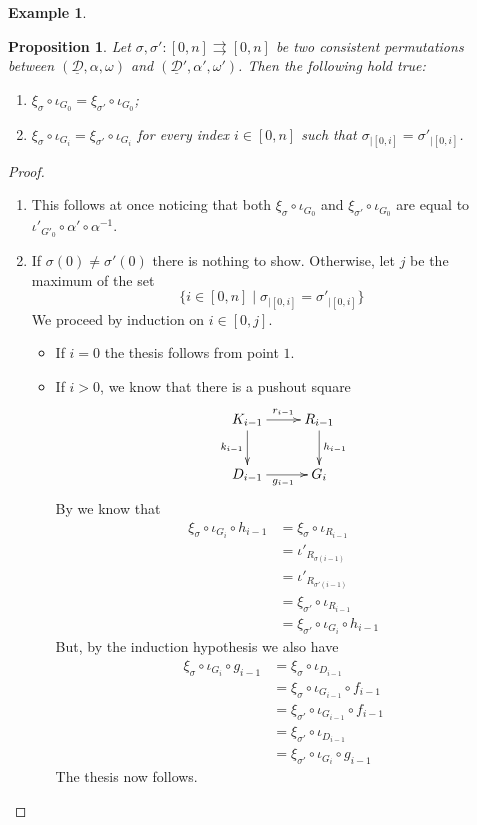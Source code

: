 \documentclass[a4paper]{article}
\newcommand{\dder}[1]{\mathscr{#1}}
\newcommand{\der}[1]{\underline{\dder{#1}}}
\newtheorem{proposition}[theorem]{Proposition}
\theoremstyle{definition}
\newtheorem{example}[theorem]{Example}
\begin{document}
\begin{example}
\end{example}

\begin{proposition}\label{prop:uniqu}
	Let $\sigma,\sigma'\colon [0,n]\rightrightarrows [0,n]$ be two consistent permutations between $(\der{D}, \alpha, \omega)$ and $(\der{D}', \alpha', \omega')$.  Then the following hold true:
	\begin{enumerate}
	\item $\xi_\sigma \circ \iota_{G_0} = \xi_{\sigma'} \circ \iota_{G_0}$;
	\item  $\xi_\sigma \circ \iota_{G_i}=\xi_{\sigma'} \circ \iota_{G_i}$ for every index $i\in [0,n]$ such that $\sigma_{|[0,i]}=\sigma'_{|[0,i]}$.
	\end{enumerate}
\end{proposition}
\begin{proof}\begin{enumerate}
		\item This follows at once noticing that both $\xi_\sigma \circ \iota_{G_0}$ and $\xi_{\sigma'} \circ \iota_{G_0}$ are equal to $\iota'_{G'_0}\circ \alpha'\circ \alpha^{-1}$.
		\item  If $\sigma(0)\neq \sigma'(0)$ there is nothing to show. Otherwise, let $j$ be the maximum of the set
		\[\{i\in [0,n]\mid \sigma_{|[0,i]}=\sigma'_{|[0,i]}\}\]
		We proceed by induction on $i\in [0,j]$. 
		\begin{itemize}
			\item If $i=0$ the thesis follows from point $1$.
			\item If $i>0$, we know that there is a pushout square
			\[\xymatrix{K_{i-1}\ar[r]^{r_{i-1}} \ar[d]_{k_{i-1}}& R_{i-1} \ar[d]^{h_{i-1}}\\ D_{i-1} \ar[r]_{g_{i-1}}& G_i}\] 
			By  we know that
			\begin{align*}
				\xi_\sigma \circ \iota_{G_i}\circ h_{i-1}&=  \xi_\sigma\circ \iota_{R_{i-1}}\\&=\iota'_{R_{\sigma(i-1)}}\\&=\iota'_{R_{\sigma'(i-1)}}\\&=\xi_{\sigma'}\circ \iota_{R_{i-1}}\\&=\xi_{\sigma'} \circ \iota_{G_i}\circ h_{i-1}
			\end{align*}
			But, by the induction hypothesis we also have
			\begin{align*}
				\xi_\sigma \circ \iota_{G_i}\circ g_{i-1}&=\xi_{\sigma}\circ \iota_{D_{i-1}}\\&=\xi_{\sigma}\circ \iota_{G_{i-1}} \circ f_{i-1}\\&=\xi_{\sigma'}\circ \iota_{G_{i-1}} \circ f_{i-1}\\&=\xi_{\sigma'}\circ \iota_{D_{i-1}} \\&=\xi_{\sigma'}\circ \iota_{G_{i}} \circ g_{i-1}
			\end{align*}
			The thesis now follows.			\qedhere
		\end{itemize}
	\end{enumerate}
\end{proof}
\end{document}
